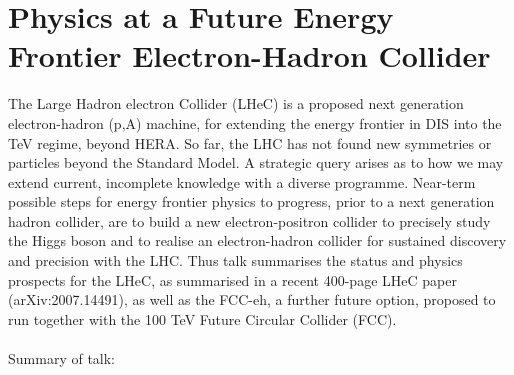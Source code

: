 \documentclass[12pt, a4paper, notitlepage, onecolumn]{article}
\begin{document}
\section{Physics at a Future Energy Frontier Electron-Hadron Collider}
\noindent The Large Hadron electron Collider (LHeC) is a proposed next generation electron-hadron (p,A) machine, for extending the energy frontier in DIS into the TeV regime, beyond HERA. So far, the LHC has not found new symmetries or particles beyond the Standard Model. A strategic query arises as to how we may extend current, incomplete knowledge with a diverse programme. Near-term possible steps for energy frontier physics to progress, prior to a next generation hadron collider, are to build a new electron-positron collider to precisely study the Higgs boson and to realise an electron-hadron collider for sustained discovery and precision with the LHC. Thus talk summarises the status and physics prospects for the LHeC, as summarised in a recent 400-page LHeC paper (arXiv:2007.14491), as well as the FCC-eh, a further future option, proposed to run together with the 100 TeV Future Circular Collider (FCC).
\\ \\
\noindent Summary of talk:
\end{document}

